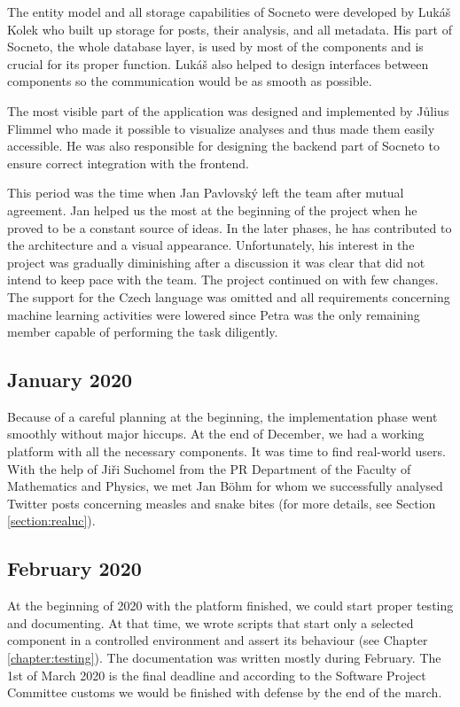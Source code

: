 The entity model and all storage capabilities of Socneto were developed by Lukáš Kolek who built up storage for posts, their analysis, and all metadata. His part of Socneto, the whole database layer, is used by most of the components and is crucial for its proper function. Lukáš also helped to design interfaces between components so the communication would be as smooth as possible. 

The most visible part of the application was designed and implemented by Jůlius Flimmel who made it possible to visualize analyses and thus made them easily accessible. He was also responsible for designing the backend part of Socneto to ensure correct integration with the frontend.

This period was the time when Jan Pavlovský left the team after mutual agreement. Jan helped us the most at the beginning of the project when he proved to be a constant source of ideas. In the later phases, he has contributed to the architecture and a visual appearance. Unfortunately, his interest in the project was gradually diminishing after a discussion it was clear that did not intend to keep pace with the team. The project continued on with few changes. The support for the Czech language was omitted and all requirements concerning machine learning activities were lowered since Petra was the only remaining member capable of performing the task diligently.

\subsection{January 2020}

Because of a careful planning at the beginning, the implementation phase went smoothly without major hiccups. At the end of  December, we had a working platform with all the necessary components. It was time to find real-world users. With the help of Jiři Suchomel from the PR Department of the Faculty of Mathematics and Physics, we met Jan Böhm for whom we successfully analysed Twitter posts concerning measles and snake bites (for more details, see Section \ref{section:realuc}). 

\subsection{February 2020}
At the beginning of 2020 with the platform finished, we could start proper testing and documenting. At that time, we wrote scripts that start only a selected component in a controlled environment and assert its behaviour (see Chapter \ref{chapter:testing}). The documentation was written mostly during February. The 1st of March 2020 is the final deadline and according to the Software Project Committee customs we would be finished with defense by the end of the march. 